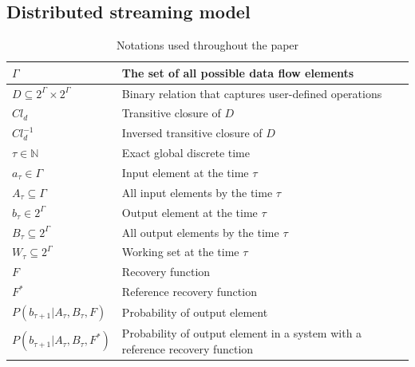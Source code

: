 \label{fs-formalism}

\subsection{Distributed streaming model}

\begin{table}[!b]
    \caption{Notations used throughout the paper}
    \begin{tabular}{l|p{5cm}}
        \hline
        $\Gamma$ & The set of all possible data flow elements \\ 
        \hline
        $D\subseteq{2^{\Gamma}\times2^{\Gamma}}$ & Binary relation that captures user-defined operations  \\
        \hline
        $Cl_d$ & Transitive closure of $D$  \\
        \hline
        $Cl^{-1}_d$ & Inversed transitive closure of $D$  \\
        \hline
        $\tau \in \mathbb{N}$ & Exact global discrete time \\
        \hline
        $a_\tau \in \Gamma$ & Input element at the time $\tau$ \\
        \hline
        $A_\tau \subseteq \Gamma$ & All input elements by the time $\tau$ \\
        \hline
        $b_\tau \in 2^{\Gamma}$ & Output element at the time $\tau$ \\
        \hline
        $B_\tau \subseteq 2^{\Gamma}$ & All output elements by the time $\tau$ \\
        \hline
        $W_\tau \subseteq 2^{\Gamma}$ & Working set at the time $\tau$ \\
        \hline
        $F$ & Recovery function \\
        \hline
        $F^{*}$ & Reference recovery function \\
        \hline
        $P(b_{\tau+1}|A_{\tau}, B_\tau, F)$ & Probability of output element \\
        \hline
        $P(b_{\tau+1}|A_{\tau}, B_\tau, F^{*})$ & Probability of output element in a system with a reference recovery function \\
    \end{tabular}
    \label{notations}
\end{table}

